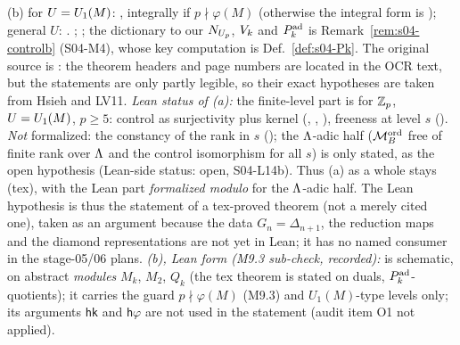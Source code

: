 \begin{theorem}
(b) for $U=U_1(M)$: \stcited{}, integrally if $p\nmid\varphi(M)$ (otherwise the integral form is \stsketch); general $U$: \stexp.
; ; the dictionary to our $N_{U_p}$, $V_k$ and $P^{\rm ad}_k$ is Remark~\ref{rem:s04-controlb} (S04-M4), whose key
computation is Def.~\ref{def:s04-Pk}. The original source is
: the theorem headers and page numbers are located in the OCR text, but the statements are only partly legible, so their exact
hypotheses are taken from Hsieh and LV11.
\emph{Lean status of (a):} the finite-level part is \stformal{} for $\mathbb{Z}_p$, $U=U_1(M)$, $p\ge5$: control as surjectivity plus kernel
(, ,
), freeness at level $s$ (). \emph{Not} formalized:
the constancy of the rank in $s$ (); the $\Lambda$-adic half ($\mathcal{M}^{\mathrm{ord}}_B$ free of finite rank over $\Lambda$ and the control
isomorphism for all $s$) is only stated, as the open hypothesis  (Lean-side status: open, S04-L14b). Thus
(a) as a whole stays \stproved{} (tex), with the Lean part \emph{formalized modulo } for the $\Lambda$-adic half. The
Lean hypothesis  is thus the statement of a tex-proved theorem (not a merely cited one), taken as an argument because the data
$G_n=\Delta_{n+1}$, the reduction maps and the diamond representations are not yet in Lean; it has no named consumer in the stage-05/06 plans.
\emph{(b), Lean form (M9.3 sub-check, recorded):}  is schematic, on abstract \emph{modules} $M_k$, $M_2$, $Q_k$ (the tex theorem is stated on
duals, $P^{\rm ad}_k$-quotients); it carries the guard $p\nmid\varphi(M)$ (M9.3) and $U_1(M)$-type levels only; its arguments \texttt{hk} and \texttt{h$\varphi$} are not used in the
statement (audit item O1 not applied).
\end{theorem}
